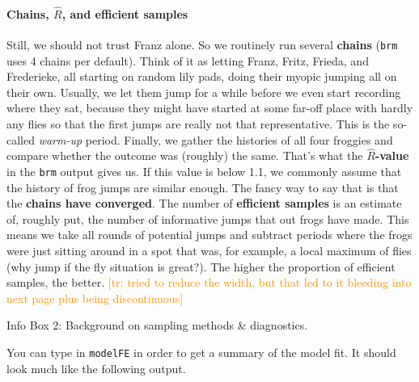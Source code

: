 \documentclass[nobib]{tufte-handout}
\newcommand{\tr}[1]{\textcolor{DarkOrange}{[tr: #1]}}
\begin{document}
\begin{InfoBox}[]
{\begin{minipage}{1\textwidth}
\paragraph{Chains, $\hat{R}$, and efficient samples}      
    Still, we should not trust Franz alone. So we routinely run several
    \textbf{chains} (\texttt{brm} uses 4 chains per default). Think of it as letting Franz,
    Fritz, Frieda, and Frederieke, all starting on random lily pads, doing their myopic jumping
    all on their own. Usually, we let them jump for a while before we even start recording
    where they sat, because they might have started at some far-off place with hardly any flies so that the first jumps are really not that representative. This is the so-called
    \emph{warm-up} period. Finally, we gather the histories of all four froggies and compare
    whether the outcome was (roughly) the same. That's what the \textbf{$\hat{R}$-value} in the
    \texttt{brm} output gives us. If this value is below 1.1, we commonly assume that the
    history of frog jumps are similar enough. The fancy way to say that is that the \textbf{chains have
      converged}. The number of \textbf{efficient samples} is an estimate of, roughly put, the
    number of informative jumps that out frogs have made. This means we take all rounds of potential jumps and subtract periods where the frogs
    were just sitting around in a spot that was, for example, a local maximum of flies (why jump if the fly situation is great?). The
    higher the proportion of efficient samples, the better.
    \tr{tried to reduce the width, but that led to it bleeding into next page plus being discontinuous}
    
  \end{minipage} \par
  } \par
  \begin{center}
    Info Box 2: Background on sampling methods \& diagnostics.
  \end{center}
\end{InfoBox}


You can type in \texttt{modelFE} in order to get a summary of the model fit. It should look much like the following output.

\medskip
\end{document}
